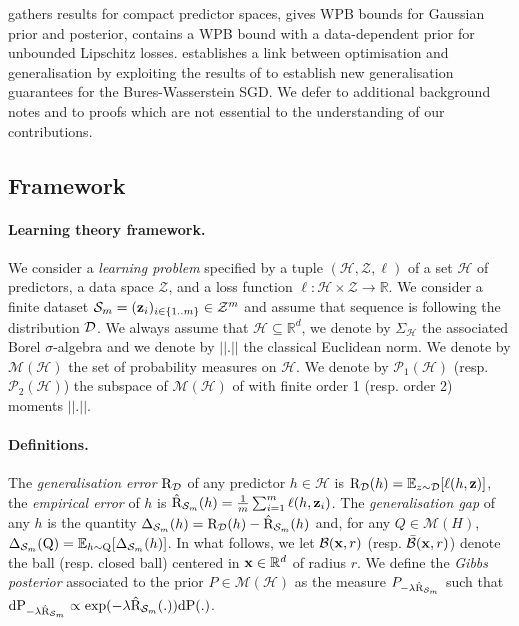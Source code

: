  gathers results for compact predictor spaces,  gives WPB bounds for Gaussian prior and posterior,  contains a WPB bound with a data-dependent prior for unbounded Lipschitz losses.  establishes a link between optimisation and generalisation by exploiting the results of \citet{lambert2022variational} to establish new generalisation guarantees for the Bures-Wasserstein SGD. We defer to  additional background notes and to  proofs which are not essential to the understanding of our contributions.


\subsection{Framework}
\label{sec: framework}

\paragraph{Learning theory framework.}
We consider a \emph{learning problem} specified by a tuple $(\mathcal{H}, \mathcal{Z}, \ell)$ of a set $\mathcal{H}$ of predictors, a data space $\mathcal{Z}$, and a loss function $\ell : \mathcal{H}\times \mathcal{Z} \rightarrow \mathbb{R} $.
We consider a finite dataset $\mathcal{S}_m=(\mathbf{z}_i)_{i\in \{1..m\}}\in\mathcal{Z}^{m}$ and assume that sequence is \iid following the distribution $\mathcal{D}$. We always assume that $\mathcal{H}\subseteq\mathbb{R}^d$, we denote by $\Sigma_{\mathcal{H}}$ the associated Borel $\sigma$-algebra and we denote by $||.||$ the classical Euclidean norm. We denote by $\mathcal{M}(\mathcal{H})$ the set of probability measures on $\mathcal{H}$.
We denote by $\mathcal{P}_1(\mathcal{H})$ (resp. $\mathcal{P}_2(\mathcal{H})$) the subspace of $\mathcal{M}(\mathcal{H})$ of with finite order 1 (resp. order 2) moments \wrt $||.||$.

\paragraph{Definitions.}
The \emph{generalisation error} $\text{R}_{\mathcal{D}}$ of any predictor $h\in\mathcal{H}$ is $\text{R}_{\mathcal{D}}(h)= \mathbb{E}_{z\sim \mathcal{D}}[\ell(h,\mathbf{z})]$, the \emph{empirical error} of $h$ is $\hat{\text{R}}_{\mathcal{S}_m}(h)= \frac{1}{m}\sum_{i=1}^m\ell(h,\mathbf{z}_i)$.
The \emph{generalisation gap} of any $h$ is the quantity $\Delta_{\mathcal{S}_m}(h)=\text{R}_{\mathcal{D}}(h)-\hat{\text{R}}_{\mathcal{S}_m}(h)$ and, for any $Q\in\mathcal{M}(H)$, $\Delta_{\mathcal{S}_m}(\mathrm{Q})= \mathbb{E}_{h\sim \mathrm{Q}}[\Delta_{\mathcal{S}_m}(h)]$. In what follows, we let $\mathcal{B}(\mathbf{x},r)$ (resp. $\bar{\mathcal{B}}(\mathbf{x},r)$) denote the ball (resp. closed ball) centered in $\mathbf{x}\in\mathbb{R}^d$ of radius $r$.
We define the \emph{Gibbs posterior} associated to the prior $P\in\mathcal{M}(\mathcal{H})$ as the measure $P_{-\lambda \hat{\text{R}}_{\mathcal{S}_m}}$ such that $\mathrm{d}\mathrm{P}_{-\lambda \hat{\text{R}}_{\mathcal{S}_m}} \propto \exp(-\lambda \hat{\text{R}}_{\mathcal{S}_m}(.)) \mathrm{d}\mathrm{P}(.)$.



